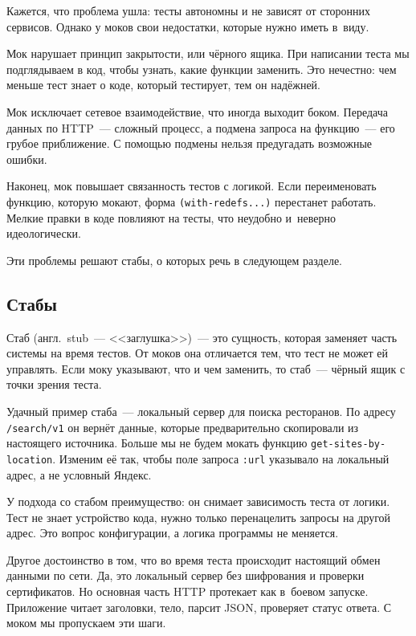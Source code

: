 Кажется, что проблема ушла: тесты автономны и не зависят от сторонних
сервисов. Однако у моков свои недостатки, которые нужно иметь в~виду.

Мок нарушает принцип закрытости, или чёрного ящика. При написании теста мы
подглядываем в код, чтобы узнать, какие функции заменить. Это нечестно: чем
меньше тест знает о коде, который тестирует, тем он надёжней.

Мок исключает сетевое взаимодействие, что иногда выходит боком. Передача данных
по HTTP~--- сложный процесс, а подмена запроса на функцию~--- его грубое
приближение. С помощью подмены нельзя предугадать возможные ошибки.

Наконец, мок повышает связанность тестов с логикой. Если переименовать функцию,
которую мокают, форма \verb|(with-redefs...)| перестанет работать. Мелкие правки
в коде повлияют на тесты, что неудобно и~неверно идеологически.

Эти проблемы решают стабы, о которых речь в следующем разделе.

\subsection{Стабы}


Стаб (англ.~stub~--- <<заглушка>>)~--- это сущность, которая заменяет часть
системы на время тестов. От моков она отличается тем, что тест не может ей
управлять. Если моку указывают, что и чем заменить, то стаб~--- чёрный ящик с
точки зрения теста.

Удачный пример стаба~--- локальный сервер для поиска ресторанов. По адресу
\verb|/search/v1| он вернёт данные, которые предварительно скопировали из
настоящего источника. Больше мы не будем мокать функцию
\verb|get-sites-by-location|. Изменим её так, чтобы поле запроса \verb|:url|
указывало на локальный адрес, а не условный Яндекс.

У подхода со стабом преимущество: он снимает зависимость теста от логики. Тест
не знает устройство кода, нужно только перенацелить запросы на другой адрес. Это
вопрос конфигурации, а логика программы не меняется.

Другое достоинство в том, что во время теста происходит настоящий обмен данными
по сети. Да, это локальный сервер без шифрования и проверки сертификатов. Но
основная часть HTTP протекает как в~боевом запуске. Приложение читает заголовки,
тело, парсит JSON, проверяет статус ответа. С моком мы пропускаем эти шаги.

